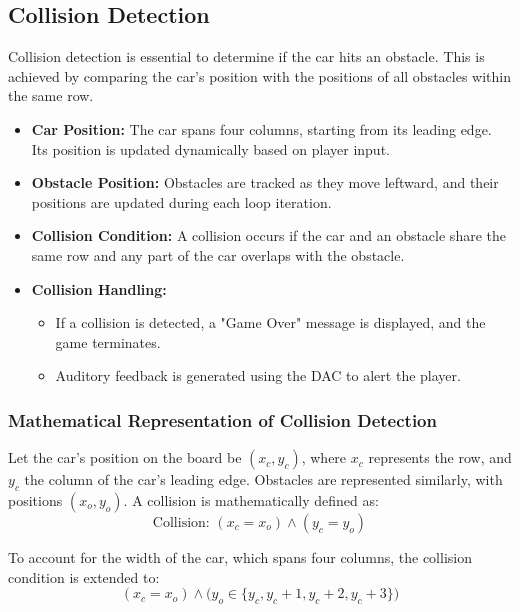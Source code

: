 \documentclass[conference]{IEEEtran}
\begin{document}
\subsection{Collision Detection}  
Collision detection is essential to determine if the car hits an obstacle. This is achieved by comparing the car's position with the positions of all obstacles within the same row.  

\begin{itemize}  
    \item \textbf{Car Position:} The car spans four columns, starting from its leading edge. Its position is updated dynamically based on player input.  
    \item \textbf{Obstacle Position:} Obstacles are tracked as they move leftward, and their positions are updated during each loop iteration.  
    \item \textbf{Collision Condition:} A collision occurs if the car and an obstacle share the same row and any part of the car overlaps with the obstacle.  
    \item \textbf{Collision Handling:}  
        \begin{itemize}  
            \item If a collision is detected, a "Game Over" message is displayed, and the game terminates.  
            \item Auditory feedback is generated using the DAC to alert the player.  
        \end{itemize}  
\end{itemize}  

\subsubsection*{Mathematical Representation of Collision Detection}  
Let the car's position on the board be \((x_c, y_c)\), where \(x_c\) represents the row, and \(y_c\) the column of the car's leading edge. Obstacles are represented similarly, with positions \((x_o, y_o)\). A collision is mathematically defined as:  
\begin{equation}  
\text{Collision: } (x_c = x_o) \land (y_c = y_o)  
\end{equation}  

To account for the width of the car, which spans four columns, the collision condition is extended to:  
\begin{equation}  
(x_c = x_o) \land \big(y_o \in \{y_c, y_c + 1, y_c + 2, y_c + 3\}\big)  
\end{equation} 
\end{document}
